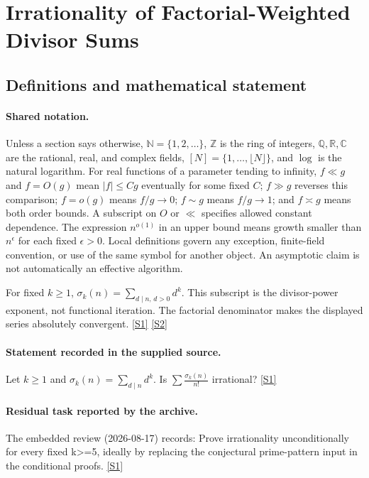 \documentclass[11pt,a4paper]{article}
\newcommand{\N}{\mathbb{N}}
\newcommand{\Z}{\mathbb{Z}}
\newcommand{\Q}{\mathbb{Q}}
\newcommand{\R}{\mathbb{R}}
\newcommand{\C}{\mathbb{C}}
\newcommand{\sref}[2]{\hyperlink{source:#1:#2}{[S#2]}}
\begin{document}
\section{Irrationality of Factorial-Weighted Divisor Sums}\label{statement}


\subsection{Definitions and mathematical statement}

\paragraph{Shared notation.}Unless a section says otherwise, $\N=\{1,2,\ldots\}$,
$\Z$ is the ring of integers, $\Q,\R,\C$ are the rational, real, and complex
fields, $[N]=\{1,\ldots,\lfloor N\rfloor\}$, and $\log$ is the natural
logarithm. For real functions of a parameter tending to infinity,
$f\ll g$ and $f=O(g)$ mean $|f|\leq Cg$ eventually for some fixed $C$;
$f\gg g$ reverses this comparison; $f=o(g)$ means $f/g\to0$;
$f\sim g$ means $f/g\to1$; and $f\asymp g$ means both order bounds.
A subscript on $O$ or $\ll$ specifies allowed constant dependence.
The expression $n^{o(1)}$ in an upper bound means growth smaller than
$n^\epsilon$ for each fixed $\epsilon>0$. Local definitions govern any
exception, finite-field convention, or use of the same symbol for another
object. An asymptotic claim is not automatically an effective algorithm.



For fixed $k\geq1$, $\sigma_k(n)=\sum_{d\mid n,\,d>0}d^k$. This subscript is the divisor-power exponent, not functional iteration. The factorial denominator makes the displayed series absolutely convergent. \sref{statement}{1} \sref{statement}{2}

\paragraph{Statement recorded in the supplied source.}
Let $k\geq 1$ and $\sigma_k(n)=\sum_{d\mid n}d^k$. Is $ \sum \frac{\sigma_k(n)}{n!} $ irrational? \sref{statement}{1}

\paragraph{Residual task reported by the archive.}

The embedded review (2026-08-17) records: Prove irrationality unconditionally for every fixed k>=5, ideally by replacing the conjectural prime-pattern input in the conditional proofs. \sref{statement}{1}
\end{document}

